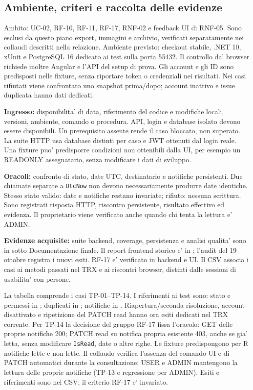 \subsection{Ambiente, criteri e raccolta delle evidenze}
Ambito: UC-02, RF-10, RF-11, RF-17, RNF-02 e feedback UI di RNF-05.
Sono esclusi da questo piano export, immagini e archivio, verificati
separatamente nei collaudi descritti nella relazione. Ambiente previsto: checkout
stabile, .NET 10, xUnit e PostgreSQL 16 dedicato ai test sulla porta 55432.
Il controllo dal browser richiede inoltre Angular e l'API del setup di prova.
Gli account e gli ID sono predisposti nelle fixture, senza riportare token
o credenziali nei risultati. Nei casi rifiutati viene confrontato uno snapshot
prima/dopo; account inattivo e issue duplicata hanno dati dedicati.

\textbf{Ingresso:} disponibilita' di data, riferimento del codice e modifiche locali,
versioni, ambiente, comando o procedura. API, login e database isolato devono
essere disponibili. Un prerequisito assente rende il caso bloccato, non superato.
La suite HTTP usa database distinti per caso e JWT ottenuti dal login reale.
Una fixture puo' predisporre condizioni non ottenibili dalla UI, per esempio
un READONLY assegnatario, senza modificare i dati di sviluppo.

\textbf{Oracoli:} confronto di stato, date UTC, destinatario e notifiche persistenti.
Due chiamate separate a \texttt{UtcNow} non devono necessariamente produrre
date identiche. Stesso stato valido: date e notifiche restano invariate;
rifiuto: nessuna scrittura. Sono registrati risposta HTTP, riscontro persistente,
risultato effettivo ed evidenza. Il proprietario viene verificato anche
quando chi tenta la lettura e' ADMIN.

\textbf{Evidenze acquisite:} suite backend, coverage, persistenza e analisi
qualita' sono in  sotto Documentazione finale.
Il report frontend storico e' in ; l'audit del
19 ottobre registra i nuovi esiti. RF-17 e' verificato in backend e UI.
Il CSV associa i casi ai metodi passati nel TRX e ai riscontri browser,
distinti dalle sessioni di usabilita' con persone.

La tabella comprende i casi TP-01--TP-14. I riferimenti ai test sono:
stato e permessi in
; duplicati in
; notifiche in
. Riapertura/seconda risoluzione,
account disattivato e ripetizione del PATCH read hanno ora esiti dedicati
nel TRX corrente. Per TP-14 la decisione del gruppo RF-17 fissa l'oracolo: GET delle
proprie notifiche 200; PATCH read su notifica propria esistente 403, anche
se gia' letta, senza modificare \texttt{IsRead}, date o altre righe.
Le fixture predispongono per R notifiche lette e non lette. Il collaudo verifica
l'assenza del comando UI e di PATCH automatici durante la consultazione;
USER e ADMIN mantengono la lettura delle proprie notifiche (TP-13 e regressione
per ADMIN). Esiti e riferimenti sono nel CSV; il criterio RF-17 e' invariato.
